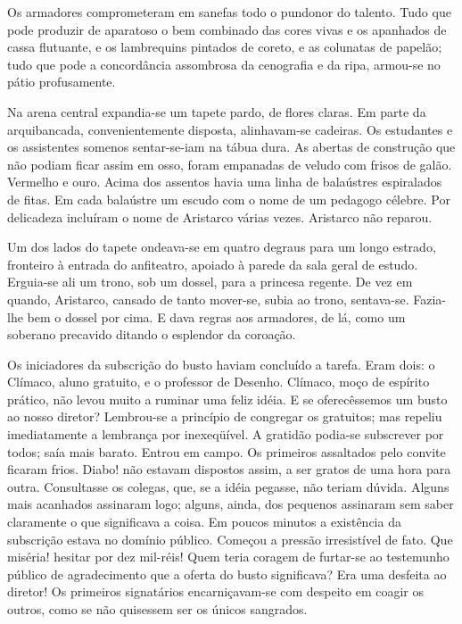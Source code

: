Os armadores comprometeram em sanefas todo o pundonor do
talento. Tudo que pode produzir de aparatoso o bem combinado das cores
vivas e os apanhados de cassa flutuante, e os lambrequins pintados de
coreto, e as colunatas de papelão; tudo que pode a concordância
assombrosa da cenografia e da ripa, armou{}-se no pátio profusamente.

Na arena central expandia{}-se um tapete pardo, de flores claras. Em
parte da arquibancada, convenientemente disposta, alinhavam{}-se
cadeiras. Os estudantes e os assistentes somenos sentar{}-se{}-iam na
tábua dura. As abertas de construção que não podiam ficar assim em
osso, foram empanadas de veludo com frisos de galão. Vermelho e ouro.
Acima dos assentos havia uma linha de balaústres espiralados de fitas.
Em cada balaústre um escudo com o nome de um pedagogo célebre. Por
delicadeza incluíram o nome de Aristarco várias vezes. Aristarco não
reparou. 

Um dos lados do tapete ondeava{}-se em quatro degraus para um
longo estrado, fronteiro à entrada do anfiteatro, apoiado à parede da
sala geral de estudo. Erguia{}-se ali um trono, sob um dossel, para a
princesa regente. De vez em quando, Aristarco, cansado de tanto
mover{}-se, subia ao trono, sentava{}-se. Fazia{}-lhe bem o dossel por
cima. E dava regras aos armadores, de lá, como um soberano precavido
ditando o esplendor da coroação. 

Os iniciadores da subscrição do busto
haviam concluído a tarefa. Eram dois: o Clímaco, aluno gratuito, e o
professor de Desenho. Clímaco, moço de espírito prático, não levou
muito a ruminar uma feliz idéia. E se oferecêssemos um busto ao nosso
diretor? Lembrou{}-se a princípio de congregar os gratuitos; mas
repeliu imediatamente a lembrança por inexeqüível. A gratidão
podia{}-se subscrever por todos; saía mais barato. Entrou em campo. Os
primeiros assaltados pelo convite ficaram frios. Diabo! não estavam
dispostos assim, a ser gratos de uma hora para outra. Consultasse os
colegas, que, se a idéia pegasse, não teriam dúvida. Alguns mais
acanhados assinaram logo; alguns, ainda, dos pequenos assinaram sem
saber claramente o que significava a coisa. Em poucos minutos a
existência da subscrição estava no domínio público. Começou a pressão
irresistível de fato. Que miséria! hesitar por dez mil{}-réis! Quem
teria coragem de furtar{}-se ao testemunho público de agradecimento que
a oferta do busto significava? Era uma desfeita ao diretor! Os
primeiros signatários encarniçavam{}-se com despeito em coagir os outros, como se
não quisessem ser os únicos sangrados. 

